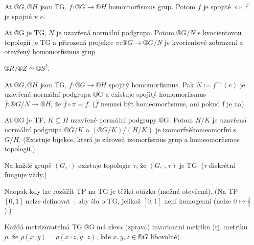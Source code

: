 \documentclass[12pt]{article}					%
\begin{document}
    \begin{tvrzeni}
        Ať $®G, ®H$ jsou TG, $f: ®G \rightarrow ®H$ homomorfismus grup. Potom $f$ je spojité $\Leftrightarrow$ f je spojité v $e$.
    \end{tvrzeni}

    \begin{veta}[Faktor TG]
        Ať ®G je TG, $N$ je uzavřená normální podgrupa. Potom $®G/N$ s kvocientovou topologií je TG a přirozená projekce $\pi: ®G \rightarrow ®G/N$ je kvocientové zobrazení a otevřený homomorfismus grup.
    \end{veta}

    \begin{priklady}
        $®R/®Z \simeq ®S^1$.
    \end{priklady}

    \begin{tvrzeni}[O homomorfismu]
        Ať $®G, ®H$ jsou TG, $f: ®G \rightarrow ®H$ spojitý homomorfismus. Pak $N := f^{-1}(e)$ je uzavřená normální podgrupa ®G a existuje spojitý homomorfismus $\overline{f}: ®G/N \rightarrow ®H$, že $\overline{f} \circ \pi = f$. ($\overline{f}$ nemusí být homeomorfismus, ani pokud f je na).
    \end{tvrzeni}

    \begin{tvrzeni}[O izomorfismu]
        Ať ®G je TF, $K \subseteq H$ uzavřené normální podgrupy ®G. Potom $H/K$ je uzavřená normální podgrupa $®G/K$ a $(®G/K)/(H/K)$ je izomorfněhomeomorfní s $G/H$. (Existuje bijekce, která je zároveň izomorfismus grup a homeomorfismus topologií.)
    \end{tvrzeni}

    \begin{poznamka}
        Na každé grupě $(G, ·)$ existuje topologie $\tau$, že $(G, ·, \tau)$ je TG. ($\tau$ diskrétní funguje vždy.)

        Naopak kdy lze rozšířit TP na TG je těžká otázka (možná otevřená). (Na TP $[0, 1]$ nelze definovat $·$, aby šlo o TG, jelikož $[0, 1]$ není homogenní (nelze $0 \mapsto \frac{1}{2}$).)
    \end{poznamka}

    \begin{veta}
        Každá metrizovatelná TG ®G má zleva (zprava) invariantní metriku (tj. metriku $\rho$, že $\rho(x, y) = \rho(x·z, y·z)$, kde $x, y, z \in ®G$ libovolné).
    \end{veta}
\end{document}
